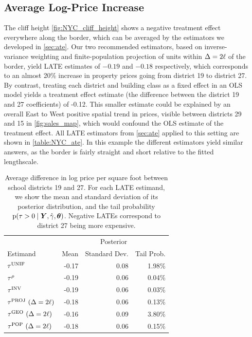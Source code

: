 \subsection{Average Log-Price Increase}
The cliff height \autoref{fig:NYC_cliff_height} shows a negative treatment effect everywhere along the border, which can be averaged by the estimators we developed in \autoref{sec:ate}.
Our two recommended estimators, based on inverse-variance weighting and finite-population projection of units within \(\Delta=2\ell\) of the border, yield LATE estimates of \(-0.19\) and \(-0.18\) respectively, which corresponds to an almost 20\% increase in property prices going from district 19 to district 27.
By contrast, treating each district and building class as a fixed effect in an OLS model yields a treatment effect estimate (the difference between the district 19 and 27 coefficients) of -0.12. 
This smaller estimate could be explained by an overall East to West positive spatial trend in prices, visible between districts 29 and 15 in \autoref{fig:sales_map}, which would confound the OLS estimate of the treatment effect.
All LATE estimators from \autoref{sec:ate} applied to this setting are shown in \autoref{table:NYC_ate}.
In this example the different estimators yield similar answers, as the border is fairly straight and short relative to the fitted lengthscale.


\begin{table}
    \centering
    \begin{tabular}{lrrr}
        \hline
        & \multicolumn{3}{c}{Posterior} \\
        Estimand & Mean & Standard Dev. & Tail Prob. \\
        \hline
          \(\tau^{\mathrm{UNIF}}\) & -0.17 & 0.08 & 1.98\% \\
          \(\tau^{\rho}\) & -0.19 & 0.06 & 0.04\% \\
          \(\tau^{\mathrm{INV}}\) & -0.19 & 0.06 & 0.03\% \\
          \(\tau^{\mathrm{PROJ}}~(\Delta=2\ell)\) & -0.18 & 0.06 & 0.13\% \\
          \(\tau^{\mathrm{GEO}}~(\Delta=2\ell)\) & -0.16 & 0.09 & 3.80\% \\
          \(\tau^{\mathrm{POP}}~(\Delta=2\ell)\) & -0.18 & 0.06 & 0.15\% \\
        \hline
    \end{tabular}
    \caption{
    \label{table:NYC_ate}
Average difference in log price per square foot between school districts 19 and 27. For each LATE estimand, we show the mean and standard deviation of its posterior distribution, and the tail probability \(\operatorname{p}(\tau > 0 \mid \bm{Y}, \hat{\gamma}, \bm{\theta})\). 
Negative LATEs correspond to district 27 being more expensive.
}
\end{table}

